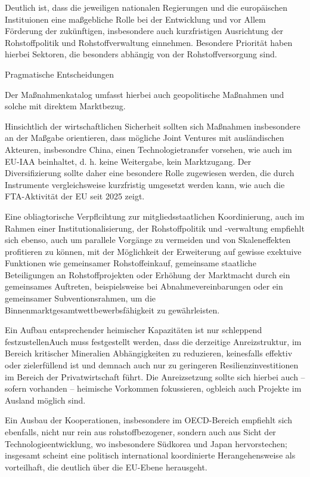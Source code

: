 \documentclass[12pt,a4paper,oneside]{book} %
\begin{document}
Deutlich ist, dass die jeweiligen nationalen Regierungen und die europäischen Instituionen eine maßgebliche Rolle bei der Entwicklung und vor Allem Förderung der zukünftigen, insbesondere auch kurzfristigen Ausrichtung der Rohstoffpolitik und Rohstoffverwaltung einnehmen. Besondere Priorität haben hierbei Sektoren, die besonders abhängig von der Rohstoffversorgung sind.

Pragmatische Entscheidungen 

Der Maßnahmenkatalog umfasst hierbei auch geopolitische Maßnahmen und solche mit direktem Marktbezug.


Hinsichtlich der wirtschaftlichen Sicherheit sollten sich Maßnahmen insbesondere an der Maßgabe orientieren, dass mögliche Joint Ventures mit ausländischen Akteuren, insbesondre China, einen Technologietransfer vorsehen, wie auch im EU-IAA beinhaltet, d. h. \glqq keine Weitergabe, kein Marktzugang\grqq.\autocite{McBridge, S. 30} Der Diversifizierung sollte daher eine besondere Rolle zugewiesen werden, die durch Instrumente vergleichsweise kurzfristig umgesetzt werden kann, wie auch die FTA-Aktivität der EU seit 2025 zeigt.

Eine obliagtorische Verpflcihtung zur mitgliedsstaatlichen Koordinierung, auch im Rahmen einer Institutionalisierung, der Rohstoffpolitik und -verwaltung empfiehlt sich ebenso, auch um parallele Vorgänge zu vermeiden und von Skaleneffekten profitieren zu können, mit der Möglichkeit der Erweiterung auf gewisse exektuive Funktionen wie gemeinsamer Rohstoffeinkauf, gemeinsame staatliche Beteiligungen an Rohstoffprojekten oder Erhöhung der Marktmacht durch ein gemeinsames Auftreten, beispielsweise bei Abnahmevereinbarungen oder ein gemeinsamer Subventionsrahmen, um die Binnenmarktgesamtwettbewerbsfähigkeit zu gewährleisten.

Ein Aufbau entsprechender heimischer Kapazitäten ist nur schleppend festzustellenAuch muss festgestellt werden, dass die derzeitige Anreizstruktur, im Bereich kritischer Mineralien Abhängigkeiten zu reduzieren, keinesfalls effektiv oder zielerfüllend ist und demnach auch nur zu geringeren Resilienzinvestitionen im Bereich der Privatwirtschaft führt. Die Anreizsetzung sollte sich hierbei auch -- sofern vorhanden -- heimische Vorkommen fokussieren, ogbleich auch Projekte im Ausland möglich sind.

Ein Ausbau der Kooperationen, insbesondere im OECD-Bereich empfiehlt sich ebenfalls, nicht nur rein aus rohstoffbezogener, sondern auch aus Sicht der Technologieentwicklung, wo insbesondere Südkorea und Japan hervorstechen; insgesamt scheint eine politisch international koordinierte Herangehensweise als vorteilhaft, die deutlich über die EU-Ebene herausgeht.
\end{document}
